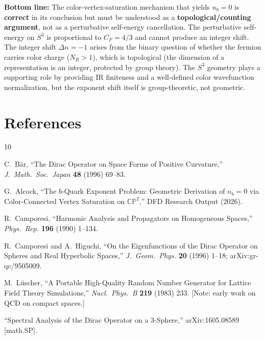 \documentclass[11pt,a4paper]{article}
\newcommand{\CP}{\mathbb{CP}}
\theoremstyle{definition}
\theoremstyle{remark}
\begin{document}
\bigskip

\noindent\textbf{Bottom line:} The color-vertex-saturation mechanism
that yields $n_b = 0$ is \textbf{correct} in its conclusion but must be
understood as a \textbf{topological/counting argument}, not as a
perturbative self-energy cancellation.  The perturbative self-energy
on $S^3$ is proportional to $C_F = 4/3$ and cannot produce an integer
shift.  The integer shift $\Delta n = -1$ arises from the binary
question of whether the fermion carries color charge ($N_R > 1$), which
is topological (the dimension of a representation is an integer,
protected by group theory).  The $S^3$ geometry plays a supporting role
by providing IR finiteness and a well-defined color wavefunction
normalization, but the exponent shift itself is group-theoretic, not
geometric.

\section*{References}

\begin{thebibliography}{10}

C.~B\"ar, ``The Dirac Operator on Space Forms of Positive Curvature,''
\textit{J.\ Math.\ Soc.\ Japan} \textbf{48} (1996) 69--83.

G.~Alcock, ``The $b$-Quark Exponent Problem: Geometric Derivation of
$n_b = 0$ via Color-Connected Vertex Saturation on $\CP^2$,''
DFD Research Output (2026).

R.~Camporesi, ``Harmonic Analysis and Propagators on Homogeneous Spaces,''
\textit{Phys.\ Rep.} \textbf{196} (1990) 1--134.

R.~Camporesi and A.~Higuchi, ``On the Eigenfunctions of the Dirac
Operator on Spheres and Real Hyperbolic Spaces,''
\textit{J.\ Geom.\ Phys.} \textbf{20} (1996) 1--18;
arXiv:gr-qc/9505009.

M.~L\"uscher, ``A Portable High-Quality Random Number Generator for
Lattice Field Theory Simulations,''
\textit{Nucl.\ Phys.\ B} \textbf{219} (1983) 233.
[Note: early work on QCD on compact spaces.]

``Spectral Analysis of the Dirac Operator on a 3-Sphere,''
arXiv:1605.08589 [math.SP].

\end{thebibliography}
\end{document}
